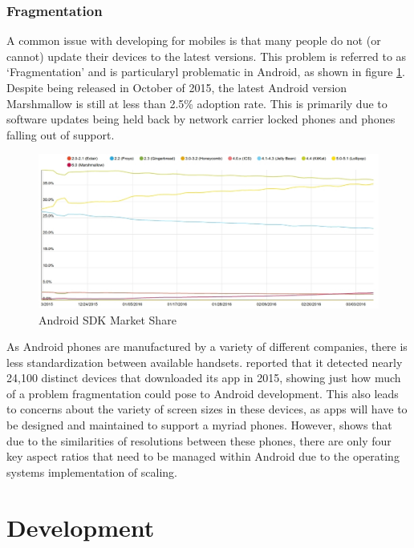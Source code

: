 \subsubsection{Fragmentation}
A common issue with developing for mobiles is that many people do not (or cannot) update their devices to the latest versions.
This problem is referred to as `Fragmentation' and is particularyl problematic in Android, as shown in figure \ref{fig:AndroidVersions}.
Despite being released in October of 2015, the latest Android version Marshmallow is still at less than 2.5\% adoption rate. 
This is primarily due to software updates being held back by network carrier locked phones and phones falling out of support.

\begin{figure}[ht]
	\centering
	\includegraphics[scale=0.4]{images/AndroidSDKMarketShare.jpg}
	\caption{Android SDK Market Share \citep{appbrainsdkversions}}
	\label{fig:AndroidVersions}
\end{figure}

As Android phones are manufactured by a variety of different companies, there is less standardization between available handsets. 
\cite{uniqueandroiddevices} reported that it detected nearly 24,100 distinct devices that downloaded its app in 2015, showing just how much of a problem fragmentation could pose to Android development.
This also leads to concerns about the variety of screen sizes in these devices, as apps will have to be designed and maintained to support a myriad phones. 
However, \cite{androidscreenfragmentation} shows that due to the similarities of resolutions between these phones, there are only four key aspect ratios that need to be managed within Android due to the operating systems implementation of scaling.

\section{Development}
